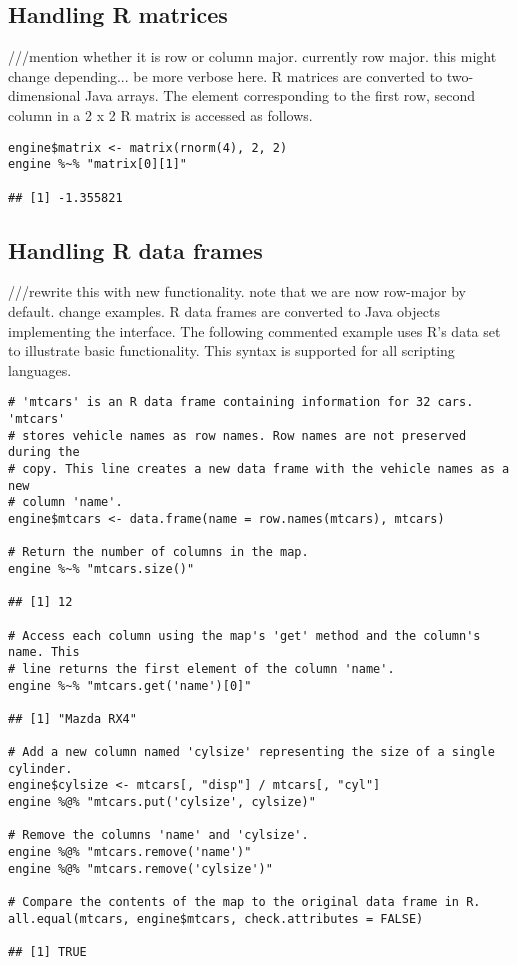 \subsection{Handling R matrices}

///mention whether it is row or column major. currently row major. this might change depending... be more verbose here.
R matrices are converted to two-dimensional Java arrays. The element corresponding to the first row, second column in a 2 x 2 R matrix is accessed as follows.

\begin{verbatim}
engine$matrix <- matrix(rnorm(4), 2, 2)
engine %~% "matrix[0][1]"

## [1] -1.355821
\end{verbatim}

\subsection{Handling R data frames}

///rewrite this with new functionality. note that we are now row-major by default. change examples.
R data frames are converted to Java objects implementing the \href{https://docs.oracle.com/javase/8/docs/api/java/util/Map.html}{} interface. The following commented example uses R's  data set to illustrate basic  functionality. This syntax is supported for all scripting languages.

\begin{verbatim}
# 'mtcars' is an R data frame containing information for 32 cars. 'mtcars'
# stores vehicle names as row names. Row names are not preserved during the
# copy. This line creates a new data frame with the vehicle names as a new 
# column 'name'.
engine$mtcars <- data.frame(name = row.names(mtcars), mtcars)

# Return the number of columns in the map.
engine %~% "mtcars.size()"

## [1] 12

# Access each column using the map's 'get' method and the column's name. This
# line returns the first element of the column 'name'.
engine %~% "mtcars.get('name')[0]"

## [1] "Mazda RX4"

# Add a new column named 'cylsize' representing the size of a single cylinder.
engine$cylsize <- mtcars[, "disp"] / mtcars[, "cyl"]
engine %@% "mtcars.put('cylsize', cylsize)"

# Remove the columns 'name' and 'cylsize'.
engine %@% "mtcars.remove('name')"
engine %@% "mtcars.remove('cylsize')"

# Compare the contents of the map to the original data frame in R.
all.equal(mtcars, engine$mtcars, check.attributes = FALSE)

## [1] TRUE
\end{verbatim}

